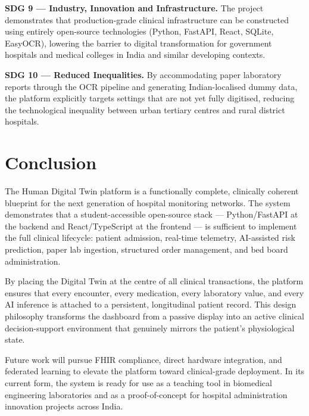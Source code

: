 \documentclass[12pt,a4paper]{article}
\begin{document}
\textbf{SDG 9 — Industry, Innovation and Infrastructure.}  The project demonstrates
that production-grade clinical infrastructure can be constructed using entirely
open-source technologies (Python, FastAPI, React, SQLite, EasyOCR), lowering the
barrier to digital transformation for government hospitals and medical colleges in India
and similar developing contexts.

\textbf{SDG 10 — Reduced Inequalities.}  By accommodating paper laboratory reports
through the OCR pipeline and generating Indian-localised dummy data, the platform
explicitly targets settings that are not yet fully digitised, reducing the technological
inequality between urban tertiary centres and rural district hospitals.

\section{Conclusion}

The Human Digital Twin platform is a functionally complete, clinically coherent
blueprint for the next generation of hospital monitoring networks. The system
demonstrates that a student-accessible open-source stack — Python/FastAPI at the
backend and React/TypeScript at the frontend — is sufficient to implement the full
clinical lifecycle: patient admission, real-time telemetry, AI-assisted risk prediction,
paper lab ingestion, structured order management, and bed board administration.

By placing the Digital Twin at the centre of all clinical transactions, the platform
ensures that every encounter, every medication, every laboratory value, and every AI
inference is attached to a persistent, longitudinal patient record. This design
philosophy transforms the dashboard from a passive display into an active clinical
decision-support environment that genuinely mirrors the patient's physiological state.

Future work will pursue FHIR compliance, direct hardware integration, and federated
learning to elevate the platform toward clinical-grade deployment. In its current form,
the system is ready for use as a teaching tool in biomedical engineering laboratories
and as a proof-of-concept for hospital administration innovation projects across India.

\end{document}

